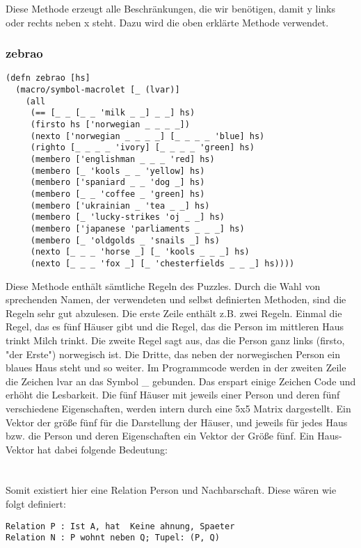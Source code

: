 Diese Methode erzeugt alle Beschränkungen, die wir benötigen, damit \dq{}y\dq{} links oder rechts neben \dq{}x\dq{} steht. Dazu wird die oben erklärte Methode  verwendet.
\\
\subsubsection{zebrao}

\begin{lstlisting}
(defn zebrao [hs]
  (macro/symbol-macrolet [_ (lvar)]
    (all
     (== [_ _ [_ _ 'milk _ _] _ _] hs)
     (firsto hs ['norwegian _ _ _ _])
     (nexto ['norwegian _ _ _ _] [_ _ _ _ 'blue] hs)
     (righto [_ _ _ _ 'ivory] [_ _ _ _ 'green] hs)
     (membero ['englishman _ _ _ 'red] hs)
     (membero [_ 'kools _ _ 'yellow] hs)
     (membero ['spaniard _ _ 'dog _] hs)
     (membero [_ _ 'coffee _ 'green] hs)
     (membero ['ukrainian _ 'tea _ _] hs)
     (membero [_ 'lucky-strikes 'oj _ _] hs)
     (membero ['japanese 'parliaments _ _ _] hs)
     (membero [_ 'oldgolds _ 'snails _] hs)
     (nexto [_ _ _ 'horse _] [_ 'kools _ _ _] hs)
     (nexto [_ _ _ 'fox _] [_ 'chesterfields _ _ _] hs))))
\end{lstlisting}

Diese Methode enthält sämtliche Regeln des Puzzles. Durch die Wahl von sprechenden Namen, der verwendeten und selbst definierten Methoden, sind die Regeln sehr gut abzulesen. Die erste Zeile enthält z.B. zwei Regeln. Einmal die Regel, das es fünf Häuser gibt und die Regel, das die Person im mittleren Haus trinkt Milch trinkt. Die zweite Regel sagt aus, das die Person ganz links (firsto, "der Erste") norwegisch ist. Die Dritte, das neben der norwegischen Person ein blaues Haus steht und so weiter.
Im Programmcode werden in der zweiten Zeile die Zeichen \dq{}lvar\dq{} an das Symbol \dq{}\_\dq{} gebunden. Das erspart einige Zeichen Code und erhöht die Lesbarkeit. 
Die fünf Häuser mit jeweils einer Person und deren fünf verschiedene Eigenschaften, werden intern durch eine 5x5 Matrix dargestellt. Ein Vektor der größe fünf für die Darstellung der Häuser, und jeweils für jedes Haus bzw. die Person und deren Eigenschaften ein Vektor der Größe fünf. Ein \dq{}Haus-Vektor\dq{} hat dabei folgende Bedeutung:
\\
\\
\\

Somit existiert hier eine Relation \dq{}Person\dq{} und \dq{}Nachbarschaft\dq{}. Diese wären wie folgt definiert:
\begin{lstlisting}
Relation P : Ist A, hat  Keine ahnung, Spaeter 
Relation N : P wohnt neben Q; Tupel: (P, Q)
\end{lstlisting}

